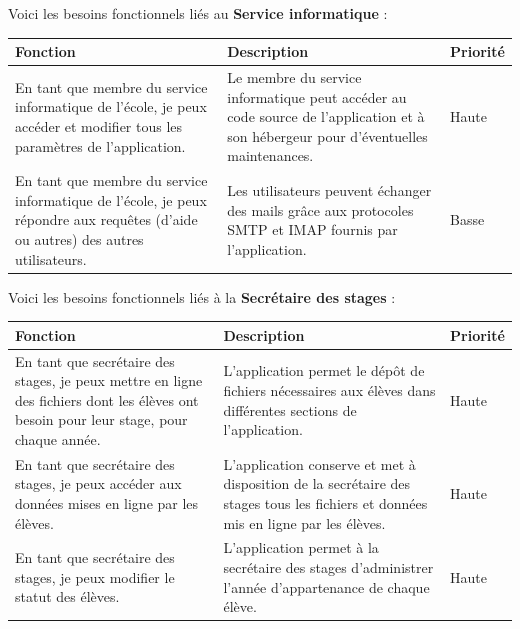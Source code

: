\documentclass{scrreprt}
\begin{document}
\vspace{1cm}
Voici les besoins fonctionnels liés au \textbf{Service informatique} :
\begin{center}
\begin{tabular}{|p{5cm}|p{7cm}|p{2cm}|}
  \hline
  \textbf {Fonction} & \textbf {Description} & \textbf {Priorité} \\
  \hline
  En tant que membre du service informatique de l'école, je peux accéder et modifier tous les paramètres de l'application. & Le membre du service informatique peut accéder au code source de l'application et à son hébergeur pour d'éventuelles maintenances.  & Haute\\
  \hline
  En tant que membre du service informatique de l'école, je peux répondre aux requêtes (d'aide ou autres) des autres utilisateurs. & Les utilisateurs peuvent échanger des mails grâce aux protocoles SMTP et IMAP fournis par l'application. & Basse\\ 
  \hline
\end{tabular}
\end{center}

\vspace{1cm}
Voici les besoins fonctionnels liés à la \textbf{Secrétaire des stages} :
\begin{center}
\begin{tabular}{|p{5cm}|p{7cm}|p{2cm}|}
  \hline
  \textbf {Fonction} & \textbf {Description} & \textbf {Priorité} \\
  \hline
  En tant que secrétaire des stages, je peux mettre en ligne des fichiers dont les élèves ont besoin pour leur stage, pour chaque année. & L'application permet le dépôt de fichiers nécessaires aux élèves dans différentes sections de l'application. & Haute\\
  \hline
  En tant que secrétaire des stages, je peux accéder aux données mises en ligne par les élèves. & L'application conserve et met à disposition de la secrétaire des stages tous les fichiers et données mis en ligne par les élèves. & Haute\\ 
  \hline
  En tant que secrétaire des stages, je peux modifier le statut des élèves. & L'application permet à la secrétaire des stages d'administrer l'année d'appartenance de chaque élève. & Haute\\ 
  \hline
\end{tabular}
\end{center}
\end{document}
